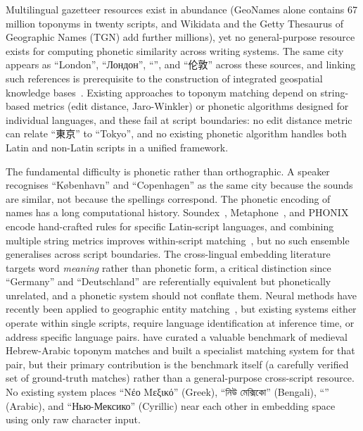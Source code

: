 \documentclass[11pt,a4paper]{article}
\newcommand{\textar}[1]{{\arabicfont\RL{#1}}}
\newcommand{\textbn}[1]{{\bengalifont #1}}
\newcommand{\textcn}[1]{{\chinesefont #1}}
\begin{document}
Multilingual gazetteer resources exist in abundance (GeoNames alone contains 67 million toponyms in twenty scripts, and Wikidata and the Getty Thesaurus of Geographic Names (TGN) add further millions), yet no general-purpose resource exists for computing phonetic similarity across writing systems. The same city appears as ``London'', ``Лондон'', ``\textar{لندن}'', and ``\textcn{伦敦}'' across these sources, and linking such references is prerequisite to the construction of integrated geospatial knowledge bases~\citep{hill2006georeferencing}. Existing approaches to toponym matching depend on string-based metrics (edit distance, Jaro-Winkler) or phonetic algorithms designed for individual languages, and these fail at script boundaries: no edit distance metric can relate ``\textcn{東京}'' to ``Tokyo'', and no existing phonetic algorithm handles both Latin and non-Latin scripts in a unified framework.

The fundamental difficulty is phonetic rather than orthographic. A speaker recognises ``København'' and ``Copenhagen'' as the same city because the sounds are similar, not because the spellings correspond. The phonetic encoding of names has a long computational history. Soundex~\citep{odell1918}, Metaphone~\citep{philips1990}, and PHONIX~\citep{gadd1990phonix} encode hand-crafted rules for specific Latin-script languages, and combining multiple string metrics improves within-script matching~\citep{recchia2013,santos2018}, but no such ensemble generalises across script boundaries. The cross-lingual embedding literature~\citep{conneau2018,artetxe2018} targets word \emph{meaning} rather than phonetic form, a critical distinction since ``Germany'' and ``Deutschland'' are referentially equivalent but phonetically unrelated, and a phonetic system should not conflate them. Neural methods have recently been applied to geographic entity matching~\citep{qiu2024geobert,rama2016,mehdie2025}, but existing systems either operate within single scripts, require language identification at inference time, or address specific language pairs. \citet{mehdie2025} have curated a valuable benchmark of medieval Hebrew-Arabic toponym matches and built a specialist matching system for that pair, but their primary contribution is the benchmark itself (a carefully verified set of ground-truth matches) rather than a general-purpose cross-script resource. No existing system places ``Νέο Μεξικό'' (Greek), ``\textbn{নিউ মেক্সিকো}'' (Bengali), ``\textar{نيومكسيكو}'' (Arabic), and ``Нью-Мексико'' (Cyrillic) near each other in embedding space using only raw character input.
\end{document}
